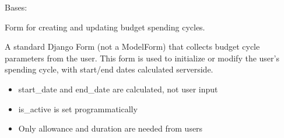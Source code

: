 \documentclass[letterpaper,10pt,english]{sphinxmanual}
\begin{document}
\begin{fulllineitems}
\label{\detokenize{expensesApp:expensesApp.froms.CycleForm}}
\pysigstartsignatures
\pysiglinewithargsret
{}
{\sphinxparamcomma {}\sphinxparamcomma {}\sphinxparamcomma {}\sphinxparamcomma {}\sphinxparamcomma {}\sphinxparamcomma {}\sphinxparamcomma {}\sphinxparamcomma {}\sphinxparamcomma {}\sphinxparamcomma {}\sphinxparamcomma {}}
{}
\pysigstopsignatures
\sphinxAtStartPar
Bases: 

\sphinxAtStartPar
Form for creating and updating budget spending cycles.

\sphinxAtStartPar
A standard Django Form (not a ModelForm) that collects budget cycle
parameters from the user. This form is used to initialize or modify
the user’s spending cycle, with start/end dates calculated server\sphinxhyphen{}side.
\begin{description}
\begin{itemize}
\item {} 
\sphinxAtStartPar
start\_date and end\_date are calculated, not user input

\item {} 
\sphinxAtStartPar
is\_active is set programmatically

\item {} 
\sphinxAtStartPar
Only allowance and duration are needed from users


\end{itemize}
\end{description}
\end{fulllineitems}
\end{document}
